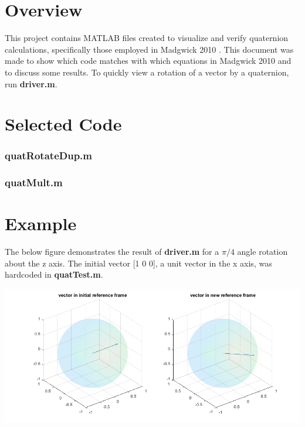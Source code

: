 \documentclass[10pt]{article}
\newcommand{\PP}{\par\hspace{1cm}}
\newcommand{\blockstart}{\vspace{1cm}\begin{minipage}{\linewidth}}
\newcommand{\blockstop}{\end{minipage}}
\begin{document}
\blockstart
\section*{Overview}
\PP This project contains MATLAB files created to visualize and verify quaternion calculations, specifically those employed in Madgwick 2010 \cite{Madgwick10}. This document was made to show which code matches with which equations in Madgwick 2010 \cite{Madgwick10} and to discuss some results. To quickly view a rotation of a vector by a quaternion, run \textbf{driver.m}.
\blockstop


\blockstart
\section*{Selected Code}

\subsubsection*{quatRotateDup.m}


\vspace{1cm}
\subsubsection*{quatMult.m}


\blockstop


\blockstart
\section*{Example}
\PP The below figure demonstrates the result of \textbf{driver.m} for a $\pi/4$ angle rotation about the z axis. The initial vector [1 0 0], a unit vector in the x axis, was hardcoded in \textbf{quatTest.m}.

\begin{center}
\includegraphics[width = 16cm]{./snap1.png}
\end{center}
\blockstop
\end{document}
